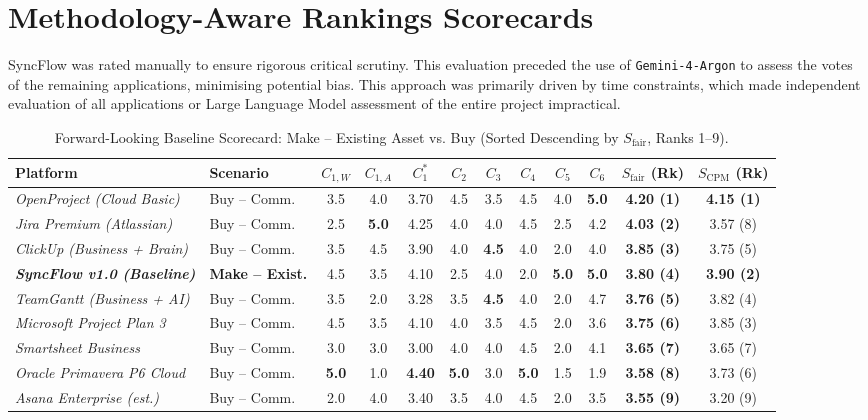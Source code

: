 \newpage

\section{Methodology-Aware Rankings Scorecards}
SyncFlow was rated manually to ensure rigorous critical scrutiny. This evaluation preceded the use of \texttt{Gemini-4-Argon} to assess the votes of the remaining applications, minimising potential bias. This approach was primarily driven by time constraints, which made independent evaluation of all applications or Large Language Model assessment of the entire project impractical.

\begin{table}[H]
\centering
\scriptsize
\setlength{\tabcolsep}{2.2pt}
\renewcommand{\arraystretch}{1.04}
\caption*{Forward-Looking Baseline Scorecard: Make -- Existing Asset vs. Buy (Sorted Descending by $S_{\text{fair}}$, Ranks 1--9).}
\begin{tabularx}{\textwidth}{>{\raggedright\arraybackslash}X l c c c c c c c c c c}
\toprule
\textbf{Platform} & \textbf{Scenario} & \textbf{$C_{1,W}$} & \textbf{$C_{1,A}$} & \textbf{$C_1^*$} & \textbf{$C_2$} & \textbf{$C_3$} & \textbf{$C_4$} & \textbf{$C_5$} & \textbf{$C_6$} & \textbf{$S_{\text{fair}}$ (Rk)} & \textbf{$S_{\text{CPM}}$ (Rk)} \\
\midrule
\textit{OpenProject (Cloud Basic)} & Buy -- Comm. & 3.5 & 4.0 & 3.70 & 4.5 & 3.5 & 4.5 & 4.0 & \textbf{5.0} & \textbf{4.20 (1)} & \textbf{4.15 (1)} \\
\textit{Jira Premium (Atlassian)} & Buy -- Comm. & 2.5 & \textbf{5.0} & 4.25 & 4.0 & 4.0 & 4.5 & 2.5 & 4.2 & \textbf{4.03 (2)} & 3.57 (8) \\
\textit{ClickUp (Business + Brain)} & Buy -- Comm. & 3.5 & 4.5 & 3.90 & 4.0 & \textbf{4.5} & 4.0 & 2.0 & 4.0 & \textbf{3.85 (3)} & 3.75 (5) \\
\textbf{\textit{SyncFlow v1.0 (Baseline)}} & \textbf{Make -- Exist.} & 4.5 & 3.5 & 4.10 & 2.5 & 4.0 & 2.0 & \textbf{5.0} & \textbf{5.0} & \textbf{3.80 (4)} & \textbf{3.90 (2)} \\
\textit{TeamGantt (Business + AI)} & Buy -- Comm. & 3.5 & 2.0 & 3.28 & 3.5 & \textbf{4.5} & 4.0 & 2.0 & 4.7 & \textbf{3.76 (5)} & 3.82 (4) \\
\textit{Microsoft Project Plan 3} & Buy -- Comm. & 4.5 & 3.5 & 4.10 & 4.0 & 3.5 & 4.5 & 2.0 & 3.6 & \textbf{3.75 (6)} & 3.85 (3) \\
\textit{Smartsheet Business} & Buy -- Comm. & 3.0 & 3.0 & 3.00 & 4.0 & 4.0 & 4.5 & 2.0 & 4.1 & \textbf{3.65 (7)} & 3.65 (7) \\
\textit{Oracle Primavera P6 Cloud} & Buy -- Comm. & \textbf{5.0} & 1.0 & \textbf{4.40} & \textbf{5.0} & 3.0 & \textbf{5.0} & 1.5 & 1.9 & \textbf{3.58 (8)} & 3.73 (6) \\
\textit{Asana Enterprise (est.)} & Buy -- Comm. & 2.0 & 4.0 & 3.40 & 3.5 & 4.0 & 4.5 & 2.0 & 3.5 & \textbf{3.55 (9)} & 3.20 (9) \\
\bottomrule
\end{tabularx}


\end{table}
